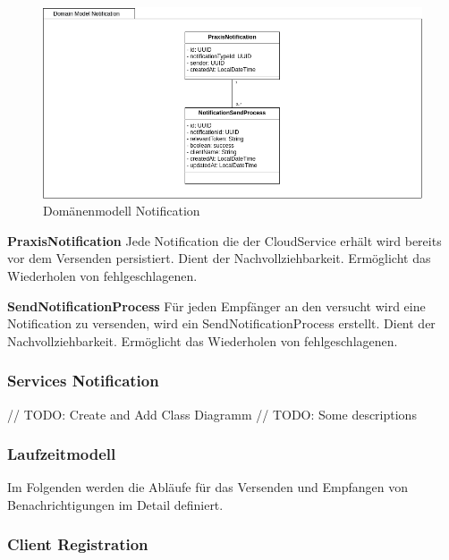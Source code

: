 \begin{figure}[h]
    \centering
    \begin{minipage}[b]{1.0\textwidth}
        \includegraphics[width=\textwidth]{graphics/Class_Notification_Domain}
        \caption{Domänenmodell Notification}
    \end{minipage}
\end{figure}

\textbf{PraxisNotification}
Jede Notification die der CloudService erhält wird bereits vor dem Versenden persistiert.
Dient der Nachvollziehbarkeit.
Ermöglicht das Wiederholen von fehlgeschlagenen.

\textbf{SendNotificationProcess}
Für jeden Empfänger an den versucht wird eine Notification zu versenden, wird ein SendNotificationProcess erstellt.
Dient der Nachvollziehbarkeit.
Ermöglicht das Wiederholen von fehlgeschlagenen.

\subsubsection*{Services Notification}

// TODO: Create and Add Class Diagramm
// TODO: Some descriptions




\clearpage

\clearpage
\subsubsection{Laufzeitmodell}

Im Folgenden werden die Abläufe für das Versenden und Empfangen von Benachrichtigungen im Detail definiert.

\subsubsection*{Client Registration}


